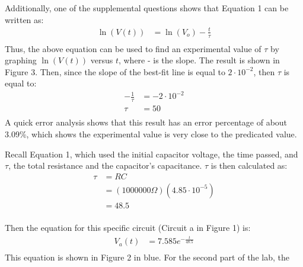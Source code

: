 \documentclass [12pt, letterpaper, twoside] {article}
\begin{document}
\noindent
Additionally, one of the supplemental questions shows that Equation 1 can be written as:
\begin{equation*}
  \begin{split}
    \ln(V(t)) &= \ln(V_{o}) - \frac{t}{\tau} \\
  \end{split}
\end{equation*}
Thus, the above equation can be used to find an experimental value of \(\tau\) by graphing \(\ln(V(t))\) versus \(t\), where - is the slope. The result is shown in Figure 3. Then, since the slope of the best-fit line is equal to \(2\cdot{10}^{-2}\), then \(\tau\) is equal to:
\begin{equation*}
  \begin{split}
    -\tfrac{1}{\tau} &= -2\cdot{10}^{-2} \\
    \tau &= 50 \\
  \end{split}
\end{equation*}
A quick error analysis shows that this result has an error percentage of about 3.09\%, which shows the experimental value is very close to the predicated value.

\noindent
Recall Equation 1, which used the initial capacitor voltage, the time passed, and \(\tau\), the total resistance and the capacitor's capacitance. \(\tau\) is then calculated as:
\begin{equation*}
  \begin{split}
    \tau &= RC \\
         &= (1000000\Omega)(4.85\cdot{10}^{-5}) \\
         & = 48.5 \\
  \end{split}
\end{equation*}

\noindent
Then the equation for this specific circuit (Circuit a in Figure 1) is:
\begin{equation*}
  \begin{split}
    V_{a}(t) &= 7.585{e}^{-\tfrac{t}{48.5}} \\
  \end{split}
\end{equation*}
This equation is shown in Figure 2 in blue. For the second part of the lab, the 

\largeVoltage
\end{document}
